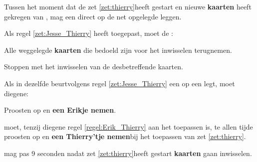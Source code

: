 \vervolgLijst{}
\item \label{zet:Jesse_Thierry} Tussen het moment dat de \huidigeSpeler zet \ref{zet:thierry}\footnotemark[1] heeft gestart en nieuwe \textbf{kaarten} heeft gekregen van \FritsN, mag \eenSpeler een \footnotemark[4] direct op de net opgelegde \footnotemark[5] leggen.
\eindLijst{}

\vervolgLijst{}
\item \label{zet:Jesse_Thierry_2} Als \eenSpeler regel \ref{zet:Jesse_Thierry} heeft toegepast, moet de \huidigeSpelerN:
\puntLijst{}
\item Alle weggelegde \textbf{kaarten} die bedoeld zijn voor het inwisselen terugnemen.
\item Stoppen met het inwisselen van de desbetreffende kaarten.
\eindPuntLijst{}
\eindLijst{}

\vervolgLijst{}
\item \label{regel:Erik_Thierry} Als \eenSpeler in dezelfde beurt\footnotemark[6] volgens regel \ref{zet:Jesse_Thierry} een \footnotemark[4] op een \footnotemark[5] legt, moet diegene:
\puntLijst{}
\item Proosten op  en \textbf{een Erikje nemen}\footnotemark[7].
\eindPuntLijst{}
\eindLijst{}

\vervolgLijst{}
\item \label{regel:Erik_Thierry_2} \EenSpeler moet, tenzij diegene regel \ref{regel:Erik_Thierry} aan het toepassen is, te allen tijde proosten op  en \textbf{een Thierry'tje nemen}\footnotemark[6] bij het toepassen van zet \ref{zet:thierry}\footnotemark[1].
\eindLijst{}


\vervolgLijst{}
\item \Frits mag pas 9 seconden nadat \eenSpeler zet \ref{zet:thierry}\footnotemark[1] heeft gestart \textbf{kaarten} gaan inwisselen.
\eindLijst{}

\footnotetext[3]{\footnoteFritsjeDesNemen}

